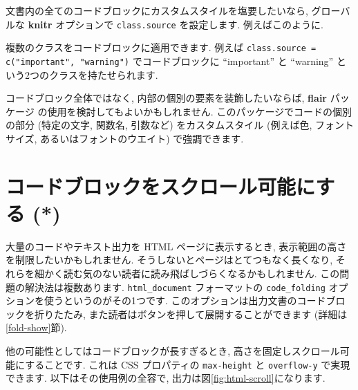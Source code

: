 \documentclass[
  11pt,
]{bxjsreport}
\newenvironment{Shaded}{\begin{snugshade}}{\end{snugshade}}
\newcommand{\AttributeTok}[1]{\textcolor[rgb]{0.77,0.63,0.00}{#1}}
\newcommand{\FunctionTok}[1]{\textcolor[rgb]{0.00,0.00,0.00}{#1}}
\newcommand{\NormalTok}[1]{#1}
\newcommand{\SpecialCharTok}[1]{\textcolor[rgb]{0.00,0.00,0.00}{#1}}
\newcommand{\StringTok}[1]{\textcolor[rgb]{0.31,0.60,0.02}{#1}}
\begin{document}
文書内の全てのコードブロックにカスタムスタイルを塩要したいなら, グローバルな \textbf{knitr} オプションで \texttt{class.source} を設定します. 例えばこのように.

\begin{Shaded}
\end{Shaded}

複数のクラスをコードブロックに適用できます. 例えば \texttt{class.source = c("important", "warning")} でコードブロックに ``important'' と ``warning'' という2つのクラスを持たせられます.

コードブロック全体ではなく, 内部の個別の要素を装飾したいならば, \textbf{flair} パッケージ \autocite{R-flair} の使用を検討してもよいかもしれません. このパッケージでコードの個別の部分 (特定の文字, 関数名, 引数など) をカスタムスタイル (例えば色, フォントサイズ, あるいはフォントのウエイト) で強調できます.

\hypertarget{html-scroll}{%
\section{コードブロックをスクロール可能にする (*)}\label{html-scroll}}

大量のコードやテキスト出力を HTML ページに表示するとき, 表示範囲の高さを制限したいかもしれません. そうしないとページはとてつもなく長くなり, それらを細かく読む気のない読者に読み飛ばしづらくなるかもしれません. この問題の解決法は複数あります. \texttt{html\_document} フォーマットの \texttt{code\_folding} オプションを使うというのがその1つです. このオプションは出力文書のコードブロックを折りたたみ, また読者はボタンを押して展開することができます (詳細は\ref{fold-show}節).

他の可能性としてはコードブロックが長すぎるとき, 高さを固定しスクロール可能にすることです. これは CSS プロパティの \texttt{max-height} と \texttt{overflow-y} で実現できます. 以下はその使用例の全容で, 出力は図\ref{fig:html-scroll}になります.
\end{document}
